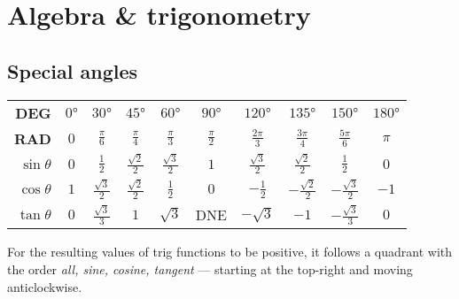 \documentclass[main.tex]{subfiles}
\begin{document}
\section{Algebra \& trigonometry}
	\subsection*{Special angles}
		\begin{tabular}{r c c c c c c c c c}
			\toprule
			\textbf{DEG} & \(\ang{0}\) & \(\ang{30}\) & \(\ang{45}\) & \(\ang{60}\) & \(\ang{90}\) & \(\ang{120}\) & \(\ang{135}\) & \(\ang{150}\) & \(\ang{180}\) \\
			\textbf{RAD} & \(0\) & \(\frac{\pi}{6}\) & \(\frac{\pi}{4}\) & \(\frac{\pi}{3}\) & \(\frac{\pi}{2}\) & \(\frac{2\pi}{3}\) & \(\frac{3\pi}{4}\) & \(\frac{5\pi}{6}\) & \(\pi\) \\ \midrule
			\(\sin\theta\) & \(0\) & \(\frac{1}{2}\) & \(\frac{\sqrt{2}}{2}\) & \(\frac{\sqrt{3}}{2}\) & \(1\) & \(\frac{\sqrt{3}}{2}\) & \(\frac{\sqrt{2}}{2}\) & \(\frac{1}{2}\) & \(0\) \\
			\(\cos\theta\) & \(1\) & \(\frac{\sqrt{3}}{2}\) & \(\frac{\sqrt{2}}{2}\) & \(\frac{1}{2}\) & \(0\) & \(-\frac{1}{2}\) & \(-\frac{\sqrt{2}}{2}\) & \(-\frac{\sqrt{3}}{2}\) & \(-1\) \\
			\(\tan\theta\) & \(0\) & \(\frac{\sqrt{3}}{3}\) & \(1\) & \(\sqrt{3}\) & DNE & \(-\sqrt{3}\) & \(-1\) & \(-\frac{\sqrt{3}}{3}\) & \(0\) \\
			\bottomrule
		\end{tabular}

		For the resulting values of trig functions to be positive, it follows a quadrant with the order \emph{all, sine, cosine, tangent} —
		starting at the top-right and moving anticlockwise.
\end{document}
